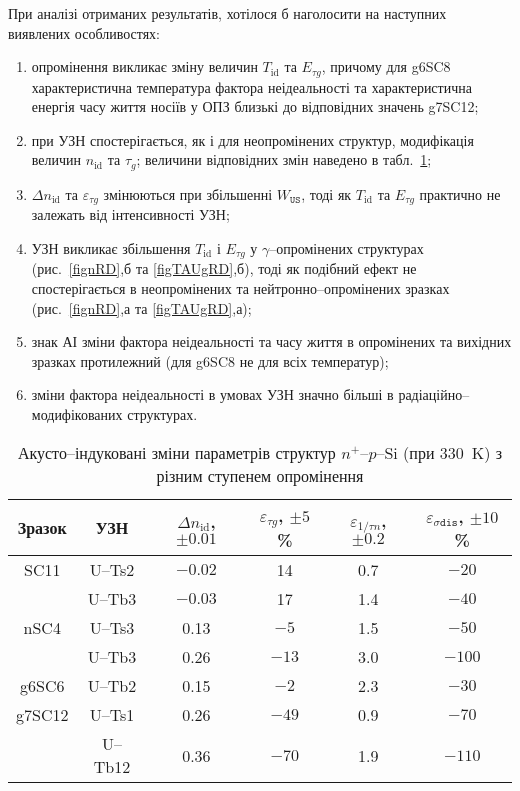 При аналізі отриманих результатів, хотілося б наголосити на наступних виявлених особливостях:
\begin{enumerate}[label=\asbuk*),leftmargin=0em,itemindent=1.5em]
\item опромінення викликає зміну величин  $T_{\mathrm{id}}$ та $E_{\tau g}$, причому
 для  g6SC8 характеристична температура фактора неідеальності та характеристична енергія часу життя носіїв у ОПЗ
 близькі до відповідних значень  g7SC12;

\item при УЗН спостерігається, як і для неопромінених структур, модифікація величин $n_{\mathrm{id}}$ та $\tau_g$;
  величини відповідних змін наведено в табл.~\ref{tabAIchangeRD};

\item $\Delta n_{\mathrm{id}}$ та $\varepsilon_{\tau g}$ змінюються при збільшенні $W_{\mathtt{US}}$,
 тоді як $T_{\mathrm{id}}$ та $E_{\tau g}$ практично не залежать від інтенсивності УЗН;

\item УЗН викликає збільшення  $T_{\mathrm{id}}$ і $E_{\tau g}$ у $\gamma$--опромінених структурах
(рис.~\ref{fignRD},б та \ref{figTAUgRD},б),
тоді як подібний ефект не спостерігається в неопромінених та нейтронно--опромінених зразках
(рис.~\ref{fignRD},а та \ref{figTAUgRD},а);

\item знак АІ зміни фактора неідеальності та часу життя в опромінених та вихідних зразках протилежний
 (для g6SC8 не для всіх температур);

\item зміни фактора неідеальності в умовах УЗН значно більші в радіаційно--модифікованих структурах.
\end{enumerate}


\begin{table}
\caption{\label{tabAIchangeRD}Акусто--індуковані зміни параметрів структур $n^+$--$p$--Si (при 330~K) з різним ступенем опромінення
}
\center
\begin{tabular}{|c|c|c|c|c|c|} \hline
Зразок&УЗН&$\Delta n_{\mathrm{id}}$, $\pm0.01$&$\varepsilon_{\tau g}$, $\pm5$\%&$\varepsilon_{1/\tau n}$, $\pm0.2$&$\varepsilon_{\sigma\mathtt{dis}}$, $\pm10$\%\\
\hline
SC11&U--Ts2&$-0.02$&14&0.7&$-20$\\
&U--Tb3&$-0.03$&17&1.4&$-40$\\ \hline
nSC4&U--Ts3&0.13&$-5$&1.5&$-50$\\
&U--Tb3&0.26&$-13$&3.0&$-100$\\ \hline
g6SC6&U--Tb2&0.15&$-2$&2.3&$-30$\\ \hline
g7SC12&U--Ts1&0.26&$-49$&0.9&$-70$\\
&U--Tb12&0.36&$-70$&1.9&$-110$\\ \hline
\end{tabular}
\end{table}


